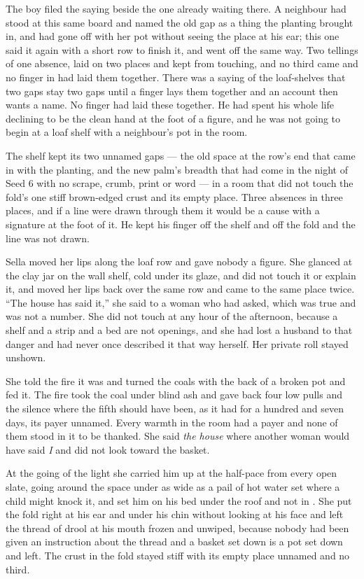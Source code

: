 The boy filed the saying beside the one already waiting there. A neighbour had stood at this same board and named the old gap as a thing the planting brought in, and had gone off with her pot without seeing the place at his ear; this one said it again with a short row to finish it, and went off the same way. Two tellings of one absence, laid on two places and kept from touching, and no third came and no finger in  had laid them together. There was a saying of the loaf-shelves that two gaps stay two gaps until a finger lays them together and an account then wants a name. No finger had laid these together. He had spent his whole life declining to be the clean hand at the foot of a figure, and he was not going to begin at a loaf shelf with a neighbour's pot in the room.

The shelf kept its two unnamed gaps --- the old space at the row's end that came in with the planting, and the new palm's breadth that had come in the night of Seed 6 with no scrape, crumb, print or word --- in a room that did not touch the fold's one stiff brown-edged crust and its empty place. Three absences in three places, and if a line were drawn through them it would be a cause with a signature at the foot of it. He kept his finger off the shelf and off the fold and the line was not drawn.

Sella moved her lips along the loaf row and gave nobody a figure. She glanced at the clay jar on the wall shelf, cold under its glaze, and did not touch it or explain it, and moved her lips back over the same row and came to the same place twice. “The house has said it,” she said to a woman who had asked, which was true and was not a number. She did not touch  at any hour of the afternoon, because a shelf and a strip and a bed are not openings, and she had lost a husband to that danger and had never once described it that way herself. Her private roll stayed unshown.

She told the fire it was  and turned the coals with the back of a broken pot and fed it. The fire took the coal under blind ash and gave back four low pulls and the silence where the fifth should have been, as it had for a hundred and seven days, its payer unnamed. Every warmth in the room had a payer and none of them stood in it to be thanked. She said \emph{the house} where another woman would have said \emph{I} and did not look toward the basket.

At the going of the light she carried him up at the half-pace from every open slate, going around the space under  as wide as a pail of hot water set where a child might knock it, and set him on his bed under the roof and not in . She put the fold right at his ear and under his chin without looking at his face and left the thread of drool at his mouth frozen and unwiped, because nobody had been given an instruction about the thread and a basket set down is a pot set down and left. The crust in the fold stayed stiff with its empty place unnamed and no third.

